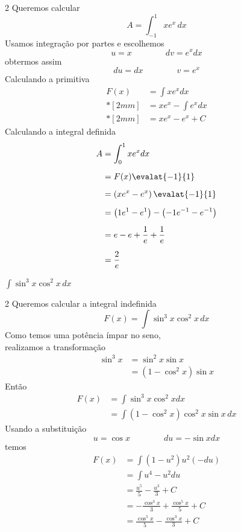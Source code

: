 \documentclass[a4paper,12pt,fleqn]{article}
\begin{document}
\begin{answer}
\begin{multicols}{2}
  Queremos calcular
  \[
    A = \int_{-1}^1 x e^x \, dx
  \]
  Usamos integração por partes e escolhemos
  \[
    u = x
    \qquad\qquad
    dv = e^x dx
  \]
  obtermos assim
  \[
    du = dx
    \qquad\qquad
    v = e^x
  \]
  Calculando a primitiva
  \begin{align*}
    F(x)
    & = \int x e^x dx           \\*[2mm]
    & = x e^x - \int e^x dx     \\*[2mm]
    & = x e^x - e^x + C
  \end{align*}
  Calculando a integral definida
\begin{align*}
    A
    & = \int_0^1 x e^x dx                        \\[2mm]
    & = F(x) \evalat{-1}{1}                      \\[2mm]
    & = \left(x e^x - e^x\right) \evalat{-1}{1}  \\[2mm]
    & = \left(1 e^1 - e^1\right)
      - \left(-1 e^{-1} - e^{-1}\right)          \\[2mm]
    & = e - e + \frac{1}{e} + \frac{1}{e}        \\[2mm]
    & = \frac{2}{e}
\end{align*}
\end{multicols}
\end{answer}

  \(
    \int \sin^3 x \cos^2 x \, dx
  \)

\begin{answer}
\begin{multicols}{2}
  Queremos calcular a integral indefinida
  \[
    F(x)
    = \int \sin^3 x \cos^2 x \, dx
  \]
  Como temos uma potência ímpar no seno,\\
  realizamos a transformação
  \begin{align*}
    \sin^3 x
    & = \sin^2 x \sin x           \\
    & = \left(1 - \cos^2 x \right)\sin x
  \end{align*}
  Então
  \begin{align*}
    F(x)
    & = \int \sin^3 x \cos^2 x dx                      \\[2mm]
    & = \int \left(1 - \cos^2 x\right)\cos^2 x \sin x\, dx
  \end{align*}
  Usando a substituição
  \[
    u = \cos x
    \qquad\qquad
    du = -\sin x dx
  \]
  temos
  \begin{align*}
    F(x)
    & = \int \left(1 - u^2\right) u^2 (-du)          \\[2mm]
    & = \int u^4 - u^2 du                            \\[2mm]
    & = \frac{u^5}{5} - \frac{u^3}{3}  + C           \\[2mm]
    & = -\frac{\cos^3 x}{3} + \frac{\cos^5 x}{5} + C \\[2mm]
    & =  \frac{\cos^5 x}{5} - \frac{\cos^3 x}{3} + C
  \end{align*}
\end{multicols}
\end{answer}
\end{document}
